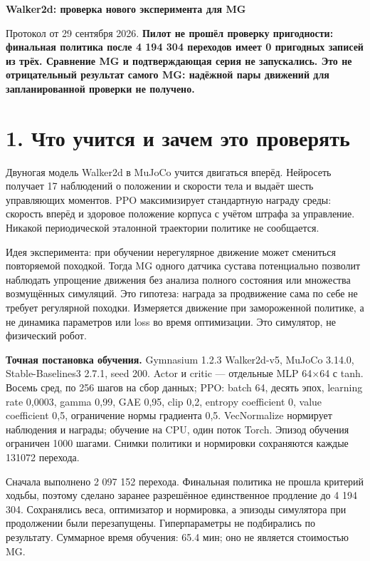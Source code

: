 \documentclass[10pt,a4paper]{article}
\begin{document}
{\Large\bfseries Walker2d: проверка нового эксперимента для MG}\par\medskip

Протокол от 29 сентября 2026. \textbf{Пилот не прошёл проверку пригодности: финальная политика после 4 194 304 переходов имеет 0 пригодных записей из трёх. Сравнение MG и подтверждающая серия не запускались. Это не отрицательный результат самого MG: надёжной пары движений для запланированной проверки не получено.}

\section*{1. Что учится и зачем это проверять}

Двуногая модель Walker2d в MuJoCo учится двигаться вперёд. Нейросеть получает 17 наблюдений о положении и скорости тела и выдаёт шесть управляющих моментов. PPO максимизирует стандартную награду среды: скорость вперёд и здоровое положение корпуса с учётом штрафа за управление. Никакой периодической эталонной траектории политике не сообщается.

Идея эксперимента: при обучении нерегулярное движение может смениться повторяемой походкой. Тогда MG одного датчика сустава потенциально позволит наблюдать упрощение движения без анализа полного состояния или множества возмущённых симуляций. Это гипотеза: награда за продвижение сама по себе не требует регулярной походки. Измеряется движение при замороженной политике, а не динамика параметров или loss во время оптимизации. Это симулятор, не физический робот.

\textbf{Точная постановка обучения.} Gymnasium 1.2.3 Walker2d-v5, MuJoCo 3.14.0, Stable-Baselines3 2.7.1, seed 200. Actor и critic --- отдельные MLP 64\ensuremath{\times}64 с tanh. Восемь сред, по 256 шагов на сбор данных; PPO: batch 64, десять эпох, learning rate 0,0003, gamma 0,99, GAE 0,95, clip 0,2, entropy coefficient 0, value coefficient 0,5, ограничение нормы градиента 0,5. VecNormalize нормирует наблюдения и награды; обучение на CPU, один поток Torch. Эпизод обучения ограничен 1000 шагами. Снимки политики и нормировки сохраняются каждые 131072 перехода.

Сначала выполнено 2 097 152 перехода. Финальная политика не прошла критерий ходьбы, поэтому сделано заранее разрешённое единственное продление до 4 194 304. Сохранялись веса, оптимизатор и нормировка, а эпизоды симулятора при продолжении были перезапущены. Гиперпараметры не подбирались по результату. Суммарное время обучения: 65.4 мин; оно не является стоимостью MG.
\end{document}
